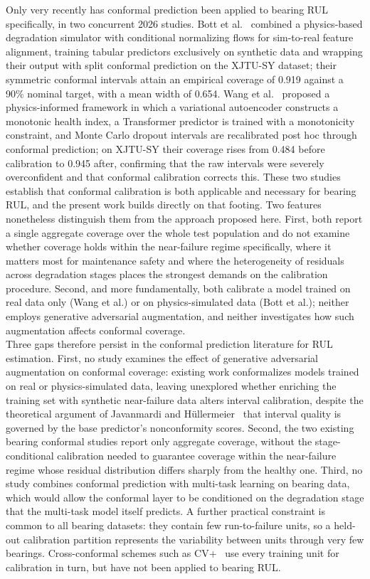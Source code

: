 Only very recently has conformal prediction been applied to bearing
RUL specifically, in two concurrent 2026 studies.
Bott et al.~\cite{11373138} combined a physics-based degradation
simulator with conditional normalizing flows for sim-to-real feature
alignment, training tabular predictors exclusively on synthetic data
and wrapping their output with split conformal prediction on the
XJTU-SY dataset; their symmetric conformal intervals attain an
empirical coverage of 0.919 against a 90\% nominal target, with a mean
width of 0.654.
Wang et al.~\cite{wang_uncertainty-aware_2026} proposed a
physics-informed framework in which a variational autoencoder
constructs a monotonic health index, a Transformer predictor is
trained with a monotonicity constraint, and Monte Carlo dropout
intervals are recalibrated post hoc through conformal prediction;
on XJTU-SY their coverage rises from 0.484 before calibration to 0.945
after, confirming that the raw intervals were severely overconfident
and that conformal calibration corrects this. These two studies
establish that conformal calibration is both applicable and necessary
for bearing RUL, and the present work builds directly on that footing.
Two features nonetheless distinguish them from the approach proposed
here. First, both report a single aggregate coverage over the whole
test population and do not examine whether coverage holds within the
near-failure regime specifically, where it matters most for maintenance
safety and where the heterogeneity of residuals across degradation
stages places the strongest demands on the calibration procedure. Second, and more
fundamentally, both calibrate a model trained on real data only (Wang
et al.) or on physics-simulated data (Bott et al.); neither employs
generative adversarial augmentation, and neither investigates how such
augmentation affects conformal coverage.\\

Three gaps therefore persist in the conformal prediction literature for
RUL estimation. First, no study examines the effect of generative
adversarial augmentation on conformal coverage: existing work
conformalizes models trained on real or physics-simulated data, leaving
unexplored whether enriching the training set with synthetic
near-failure data alters interval calibration, despite the theoretical
argument of Javanmardi and
H{\"u}llermeier~\cite{javanmardi_conformal_2023} that interval quality
is governed by the base predictor's nonconformity scores. Second, the
two existing bearing conformal studies report only aggregate coverage,
without the stage-conditional calibration needed to guarantee coverage
within the near-failure regime whose residual distribution differs
sharply from the healthy one. Third, no study combines conformal
prediction with multi-task learning on bearing data, which would allow
the conformal layer to be conditioned on the degradation stage that
the multi-task model itself predicts. A further practical constraint
is common to all bearing datasets: they contain few run-to-failure
units, so a held-out calibration partition represents the variability
between units through very few bearings. Cross-conformal schemes such
as CV+~\cite{barber2021jackknife} use every training unit for
calibration in turn, but have not been applied to bearing RUL.


